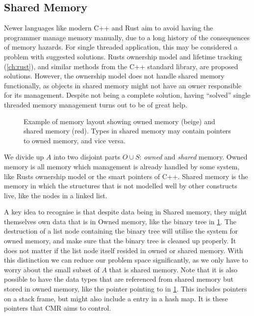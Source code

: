 \subsection{Shared Memory}

Newer languages like modern C++ and Rust aim to avoid having the programmer manage memory manually,
due to a long history of the consequences of memory hazards. For single threaded application, this
may be considered a problem with suggested solutions. Rusts ownership model and lifetime tracking
(\cref{ch:rust}), and similar methods from the C++ standard library, are proposed solutions.
However, the ownership model does not handle shared memory functionally, as objects in shared
memory might not have an owner responsible for its management. Despite not being a complete
solution, having ``solved'' single threaded memory management turns out to be of great help.

\begin{figure}[ht]
  \centering
  
  \caption{Example of memory layout showing owned memory (beige) and shared memory (red). Types in
  shared memory may contain pointers to owned memory, and vice versa.\label{fig:rust-shared-mem}}
\end{figure}

We divide up $A$ into two disjoint parts $O \cup S$: \emph{owned} and \emph{shared} memory.  Owned
memory is all memory which management is already handled by some system, like Rusts ownership model
or the smart pointers of C++. Shared memory is the memory in which the structures that is not
modelled well by other constructs live, like the nodes in a linked list.

A key idea to recognise is that despite data being in Shared memory, they might themselves own data
that is in Owned memory, like the binary tree in \cref{fig:rust-shared-mem}. The destruction of a
list node containing the binary tree will utilise the system for owned memory, and make sure that
the binary tree is cleaned up properly. It does not matter if the list node itself resided in owned
or shared memory.  With this distinction we can reduce our problem space significantly, as we only
have to worry about the small subset of $A$ that is shared memory.  Note that it is also possible
to have the data types that are referenced from shared memory but stored in owned memory, like the
pointer pointing to  in \cref{fig:rust-shared-mem}.  This includes pointers on a stack
frame, but might also include a entry in a hash map. It is these pointers that CMR aims to control.


